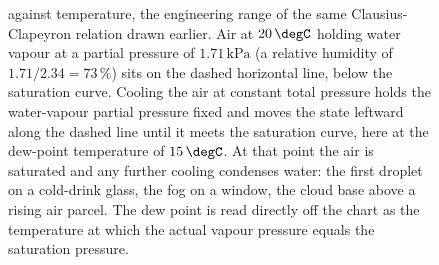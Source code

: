 \begin{figure}[htbp]
{against temperature, the engineering range of the same Clausius-Clapeyron
relation drawn earlier. Air at $20\,\degC$ holding water vapour at a
partial pressure of $1.71\,\text{kPa}$ (a relative humidity of
$1.71/2.34 = 73\,\%$) sits on the dashed horizontal line, below the
saturation curve. Cooling the air at constant total pressure holds the
water-vapour partial pressure fixed and moves the state leftward along the
dashed line until it meets the saturation curve, here at the dew-point
temperature of $15\,\degC$. At that point the air is saturated and any
further cooling condenses water: the first droplet on a cold-drink glass,
the fog on a window, the cloud base above a rising air parcel. The dew
point is read directly off the chart as the temperature at which the
actual vapour pressure equals the saturation pressure.}
\label{fig:vol04ch02:dewpoint-construction}
\end{figure}
